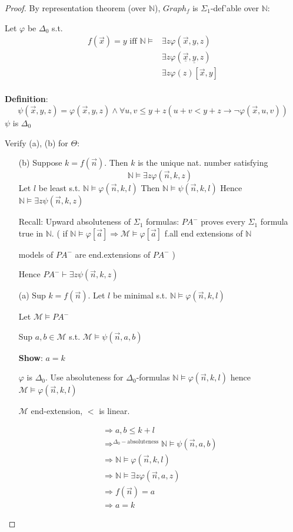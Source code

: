 \documentclass[12pt]{article}
\newcommand{\Nat}{\ensuremath{\mathbb{N}}}
\newcommand{\proves}{\vdash}
\newcommand{\defn}{\textbf{Definition}: }
\begin{document}
\begin{proof}
 By representation theorem (over $\Nat$), $Graph_f$ is
$\Sigma_1$-def'able over $\Nat$:

Let $\varphi$ be $\Delta_0$ s.t.
\begin{align*}
  f(\vec{x}) = y \text{ iff } \Nat \models &\exists z \varphi(\vec{x},y,z) \\
  &\exists z \varphi( \underline{\vec{x}} , \underline{y} ,z) \\
  &\exists z \varphi(z) [\vec{x}, y] \\
\end{align*}

\defn \[
\psi(\vec{x}, y, z) = \varphi(\vec{x}, y, z) \wedge \forall u, v \le y+z
( u+v < y + z \rightarrow \neg\varphi(\vec{x}, u, v) )
\]
$\psi$ is $\Delta_0$

Verify (a), (b) for $\Theta$:

\begin{enumerate}
  \item[(b)]
    Suppose $k=f(\vec{n})$. Then $k$ is the unique nat. number satisfying
    \[ \Nat \models \exists z \varphi(\vec{n}, k, z) 
    \]
    Let $l$ be least s.t. $\Nat \models \varphi(\vec{n}, k, l)$
    Then $\Nat \models \psi(\vec{n},k,l)$
    Hence $\Nat \models \exists z \psi(\vec{n},k,z)$

Recall: Upward absoluteness of $\Sigma_1$ formulas:
$PA^-$ proves every $\Sigma_1$ formula true in $\Nat$.
(
if $\Nat \models \varphi[\vec{a}] \Rightarrow 
\mathcal{M} \models \varphi[\vec{a}]$ f.all end extensions of $\Nat$

models of $PA^-$ are end.extensions of $PA^-$
)

Hence $PA^- \proves \exists z \psi(\vec{n},k,z)$

\item[(a)]
  Sup $k = f(\vec{n})$.
  Let $l$ be minimal s.t. 
  $\Nat \models \varphi(\vec{n},k,l)$

  Let $\mathcal{M} \models PA^-$

  Sup $a,b \in \mathcal{M}$ s.t. $\mathcal{M} \models \psi(\vec{n},a,b)$

  \textbf{Show}: $a = k$

  $\varphi$ is $\Delta_0$.  Use absoluteness for $\Delta_0$-formulas
  $\Nat \models \varphi(\vec{n},k,l)$ hence $\mathcal{M} \models \varphi(\vec{n},k,l)$

  $\mathcal{M}$ end-extension, $<$ is linear.
  
\begin{align*}
  \Rightarrow a,b \le k+l \\
  \Rightarrow^{\Delta_0-\text{absoluteness}} 
  \Nat \models \psi(\vec{n},a,b) \\
  \Rightarrow \Nat \models \varphi(\vec{n},k,l) \\
  \Rightarrow \Nat \models \exists z \varphi(\vec{n},a,z) \\
  \Rightarrow f(\vec{n}) = a \\
  \Rightarrow a = k
\end{align*}
\end{enumerate}
\end{proof}
\end{document}
